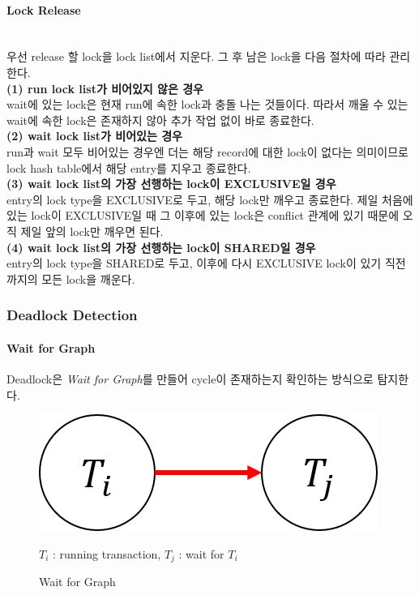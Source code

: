 \documentclass[main.tex]{subfiles}
\begin{document}
\paragraph{Lock Release}\mbox{}\\
우선 release 할 lock을 lock list에서 지운다. 그 후 남은 lock을 다음 절차에 따라 관리한다.\mbox{}\\

\noindent \textbf{(1) run lock list가 비어있지 않은 경우}\\
\indent wait에 있는 lock은 현재 run에 속한 lock과 충돌 나는 것들이다. 따라서 깨울 수 있는 wait에 속한 lock은 존재하지 않아 추가 작업 없이 바로 종료한다.
\mbox{}\\

\noindent \textbf{(2) wait lock list가 비어있는 경우}\\
\indent run과 wait 모두 비어있는 경우엔 더는 해당 record에 대한 lock이 없다는 의미이므로 lock hash table에서 해당 entry를 지우고 종료한다.
\mbox{}\\

\noindent \textbf{(3) wait lock list의 가장 선행하는 lock이 EXCLUSIVE일 경우}\\
\indent entry의 lock type을 EXCLUSIVE로 두고, 해당 lock만 깨우고 종료한다. 제일 처음에 있는 lock이 EXCLUSIVE일 때 그 이후에 있는 lock은 conflict 관계에 있기 때문에 오직 제일 앞의 lock만 깨우면 된다.
\mbox{}\\

\noindent \textbf{(4) wait lock list의 가장 선행하는 lock이 SHARED일 경우}\\
\indent entry의 lock type을 SHARED로 두고, 이후에 다시 EXCLUSIVE lock이 있기 직전까지의 모든 lock을 깨운다.
\mbox{}\\

\subsubsection{Deadlock Detection}

\paragraph{Wait for Graph}
Deadlock은 \emph{Wait for Graph}를 만들어 cycle이 존재하는지 확인하는 방식으로 탐지한다.

\newpage
\begin{figure}[!hbp]
	\centering
	\includegraphics[width=.4\textwidth]{images/cc/wait_for_graph.png}
	
	$T_i$ : running transaction, $T_j$ : wait for $T_i$
	
	\caption{Wait for Graph}
\end{figure}
\end{document}
